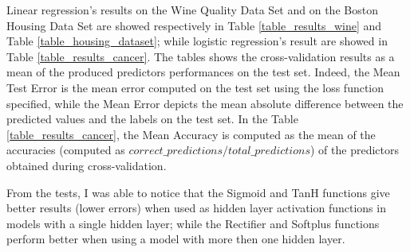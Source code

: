 \documentclass[10pt,journal,A4paper,compsoc,epsfig]{IEEEtran}
\begin{document}
Linear regression's results on the Wine Quality Data Set and on the Boston Housing Data Set are showed respectively in Table \ref{table_results_wine} and Table \ref{table_housing_dataset}; while logistic regression's result are showed in Table \ref{table_results_cancer}. The tables shows the cross-validation results as a mean of the produced predictors performances on the test set. Indeed, the Mean Test Error is the mean error computed on the test set using the loss function specified, while the Mean Error depicts the mean absolute difference between the predicted values and the labels on the test set. In the Table \ref{table_results_cancer}, the Mean Accuracy is computed as the mean of the accuracies (computed as $correct\_predictions/total\_predictions$) of the predictors obtained during cross-validation.

From the tests, I was able to notice that the Sigmoid and TanH functions give better results (lower errors) when used as hidden layer activation functions in models with a single hidden layer; while the Rectifier and Softplus functions perform better when using a model with more then one hidden layer.
\end{document}
